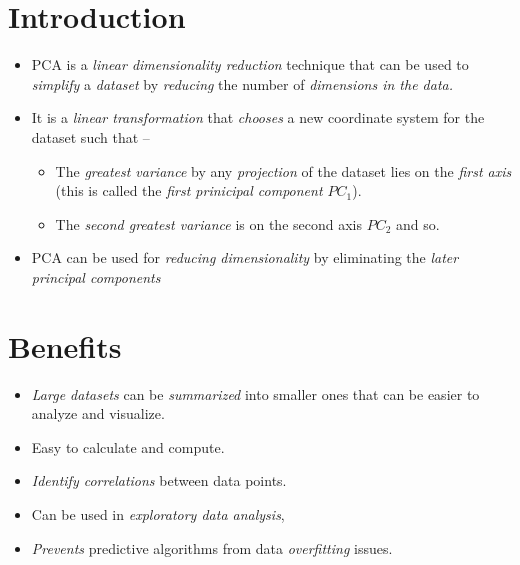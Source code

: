 \documentclass[
	number={7},
	title={Principal Component Analysis}
]{cs584notes}
\begin{document}
\section{Introduction}\label{sec:introduction}
\begin{itemize}
	\item PCA is a \emph{linear dimensionality reduction} technique that can be used to \emph{simplify} a \emph{dataset} by \emph{reducing} the number of \emph{dimensions in the data.}
	\item It is a \emph{linear transformation} that \emph{chooses} a new coordinate system for the dataset such that --
	\begin{itemize}
		\item The \emph{greatest variance} by any \emph{projection} of the dataset lies on the \emph{first axis} (this is called the \emph{first prinicipal component $PC_{1}$}).
		\item The \emph{second greatest variance} is on the second axis \emph{$PC_{2}$} and so.
	\end{itemize}
	\item PCA can be used for \emph{reducing dimensionality} by eliminating the \emph{later principal components}
\end{itemize}

\section{Benefits}\label{sec:benefits}
\begin{itemize}
	\item \emph{Large datasets} can be \emph{summarized} into smaller ones that can be easier to analyze and visualize.
	\item Easy to calculate and compute.
	\item \emph{Identify correlations} between data points.
	\item Can be used in \emph{exploratory data analysis},
	\item \emph{Prevents} predictive algorithms from data \emph{overfitting} issues.
\end{itemize}
\end{document}
